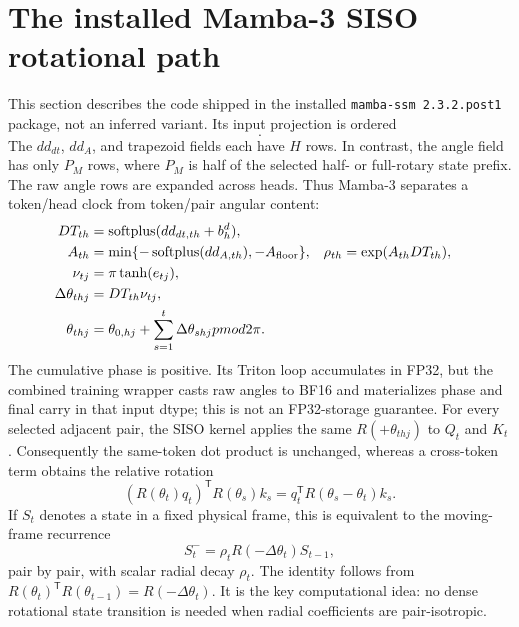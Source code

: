 \documentclass[11pt]{article}
\newcommand{\tr}{\mathsf{T}}
\newcommand{\splus}{\operatorname{softplus}}
\begin{document}
\section{The installed Mamba-3 SISO rotational path}
\label{sec:mamba3}

This section describes the code shipped in the installed \texttt{mamba-ssm 2.3.2.post1} package,
not an inferred variant.  Its input projection is ordered
\begin{equation}
  [z,x,B,C,dd_{dt},dd_A,\mathrm{trap},\mathrm{angle}].
\end{equation}
The $dd_{dt}$, $dd_A$, and trapezoid fields each have $H$ rows.  In contrast, the angle field has
only $P_M$ rows, where $P_M$ is half of the selected half- or full-rotary state prefix.  The raw
angle rows are expanded across heads.  Thus Mamba-3 separates a token/head clock from token/pair
angular content:
\begin{align}
  DT_{th} &= \splus(dd_{dt,th}+b^d_h),\\
  A_{th} &= \min\{-\splus(dd_{A,th}),-A_{\rm floor}\},
  & \rho_{th}&=\exp(A_{th}DT_{th}),\\
  \nu_{tj} &= \pi\tanh(e_{tj}),\\
  \Delta\theta_{thj} &= DT_{th}\nu_{tj},\\
  \theta_{thj} &= \theta_{0,hj}+\sum_{s=1}^{t}\Delta\theta_{shj}pmod{2\pi}.
  \label{eq:m3-phase}
\end{align}
The cumulative phase is positive.  Its Triton loop accumulates in FP32, but the combined training
wrapper casts raw angles to BF16 and materializes phase and final carry in that input dtype; this is
not an FP32-storage guarantee.  For every selected adjacent pair, the SISO kernel applies the
same $R(+\theta_{thj})$ to $Q_t$ and $K_t$.  Consequently the same-token dot product is unchanged,
whereas a cross-token term obtains the relative rotation
\begin{equation}
  (R(\theta_t)q_t)^{\tr}R(\theta_s)k_s
  =q_t^{\tr}R(\theta_s-\theta_t)k_s.
  \label{eq:m3-relative}
\end{equation}
If $S_t$ denotes a state in a fixed physical frame, this is equivalent to the moving-frame
recurrence
\begin{equation}
  S_t^- = \rho_t R(-\Delta\theta_t)S_{t-1},
  \label{eq:m3-moving-frame}
\end{equation}
pair by pair, with scalar radial decay $\rho_t$.  The identity follows from
$R(\theta_t)^{\tr}R(\theta_{t-1})=R(-\Delta\theta_t)$.  It is the key computational idea: no dense
rotational state transition is needed when radial coefficients are pair-isotropic.
\end{document}
